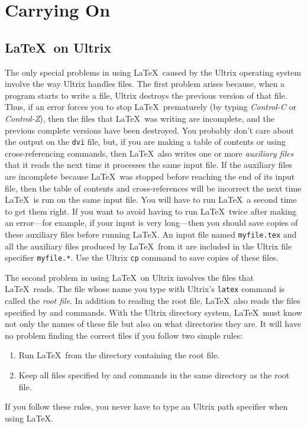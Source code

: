  
\section{Carrying On}
 
\subsection{\LaTeX\ on Ultrix} \label{sec:op-system}
 
The only special problems in using \LaTeX\ caused by the Ultrix
operating system involve the way Ultrix handles files.  The first
problem arises because, when a program starts to write a file, Ultrix
destroys the previous version of that file.  Thus, if an error forces
you to stop \LaTeX\ prematurely (by typing {\em Control-C\/} or {\em
Control-Z\/}), then the files that \LaTeX\ was writing are incomplete,
and the previous complete versions have been destroyed.  You probably
don't care about the output on the {\tt dvi} file, but, if you are
making a table of contents or using cross-referencing commands, then
\LaTeX\ also writes one or more {\em auxiliary files\/} that it reads
the next time it processes the same input file.  If the auxiliary files
are incomplete because \LaTeX\ was stopped before reaching the end of
its input file, then the table of contents and cross-references will be
incorrect the next time \LaTeX\ is run on the same input file.  You
will have to run \LaTeX\ a second time to get them right.  If you want
to avoid having to run \LaTeX\ twice after making an error---for
example, if your input is very long---then you should save copies of
these auxiliary files before running \LaTeX. An input file named
\mbox{\tt myfile.tex} and all the auxiliary files produced by \LaTeX\
from it are included in the Ultrix file specifier \mbox{\tt myfile.*}.
Use the Ultrix {\tt cp} command to save copies of these files.
 
The second problem in using \LaTeX\ on Ultrix involves the files that
\LaTeX\ reads.  The file whose name you type with Ultrix's {\tt latex}
command is called the {\em root file}.  In addition to reading the root
file, \LaTeX\ also reads the files specified by \hbox{\verb||}
and \hbox{\verb||} commands.  With the Ultrix directory system,
\LaTeX\ must know not only the names of these file but also on what
directories they are.  It will have no problem finding the correct
files if you follow two simple rules:
\begin{enumerate}
 \item Run \LaTeX\ from the directory containing the root file.
 \item Keep all files specified by \hbox{\verb||} and 
      \hbox{\verb||} commands in the same directory as the root
       file.
\end{enumerate}
If you follow these rules, you never have to type an Ultrix path
specifier when using \LaTeX.
 
